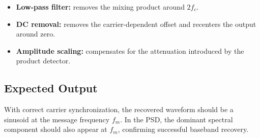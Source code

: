 \begin{itemize}
\item \textbf{Low-pass filter:} removes the mixing product around $2f_c$.
\item \textbf{DC removal:} removes the carrier-dependent offset and recenters the
output around zero.
\item \textbf{Amplitude scaling:} compensates for the attenuation introduced by
the product detector.
\end{itemize}

\subsection{Expected Output}

With correct carrier synchronization, the recovered waveform should be a sinusoid
at the message frequency $f_m$. In the PSD, the dominant spectral component
should also appear at $f_m$, confirming successful baseband recovery.
